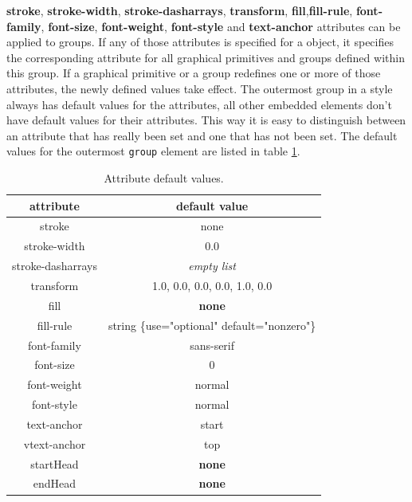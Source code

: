 \textbf{stroke}, 
\textbf{stroke-width}, \textbf{stroke-dash\-arrays}, \textbf{transform}, 
\textbf{fill},{\textbf{fill-rule}}, \textbf{font-family}, \textbf{font-size}, \textbf{font-weight}, 
\textbf{font-style} and \textbf{text-anchor} attributes can be applied to 
groups. If any of those attributes is specified for a \Group object, it 
specifies the corresponding attribute for all graphical primitives and groups 
defined within this group. If a graphical primitive or a group redefines one or 
more of those attributes, the newly defined values take effect. 
The outermost group in a style always has default values for the attributes, all other embedded elements don't
have default values for their attributes. This way it is easy to distinguish between an attribute that
has really been set and one that has not been set.
The default values for the outermost \texttt{group} element are listed in table \ref{attribute_defaults}. 

\vspace{0.5cm}
\begin{table}[h]
\begin{center}
\begin{tabular}{|c|c|}\hline
\textbf{attribute} & \textbf{default value} \\ \hline\hline
stroke & none \\ \hline
stroke-width & 0.0 \\ \hline
stroke-dasharrays & \textit{empty list} \\ \hline
transform &  1.0, 0.0, 0.0, 0.0, 1.0, 0.0 \\ \hline
fill & \textbf{none}\\ \hline
fill-rule & string \{use="optional" default="nonzero"\}\\ \hline
font-family & sans-serif \\ \hline
font-size & 0 \\ \hline
font-weight & normal \\ \hline
font-style & normal \\ \hline
text-anchor & start\\ \hline
vtext-anchor & top\\ \hline
startHead & \textbf{none} \\ \hline
endHead & \textbf{none} \\ \hline
\end{tabular}
\end{center}
\caption{Attribute default values.}
\label{attribute_defaults}
\end{table}
\vspace{0.5cm}


